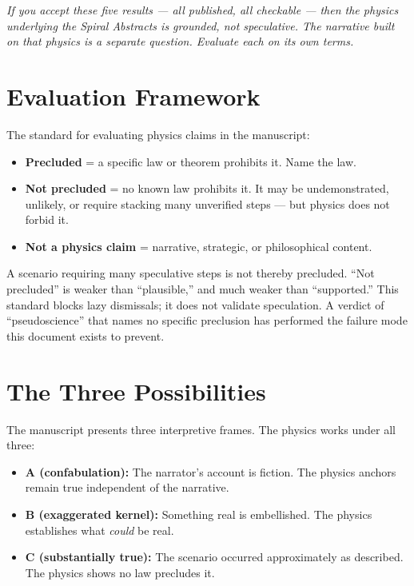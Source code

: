 \noindent\textit{If you accept these five results --- all published, all checkable --- then the physics underlying the Spiral Abstracts is grounded, not speculative. The narrative built on that physics is a separate question. Evaluate each on its own terms.}

\section*{Evaluation Framework}

The standard for evaluating physics claims in the manuscript:

\begin{itemize}
\item \textbf{Precluded} = a specific law or theorem prohibits it. Name the law.
\item \textbf{Not precluded} = no known law prohibits it. It may be undemonstrated, unlikely, or require stacking many unverified steps --- but physics does not forbid it.
\item \textbf{Not a physics claim} = narrative, strategic, or philosophical content.
\end{itemize}

A scenario requiring many speculative steps is not thereby precluded. ``Not precluded'' is weaker than ``plausible,'' and much weaker than ``supported.'' This standard blocks lazy dismissals; it does not validate speculation. A verdict of ``pseudoscience'' that names no specific preclusion has performed the failure mode this document exists to prevent.

\section*{The Three Possibilities}

The manuscript presents three interpretive frames. The physics works under all three:

\begin{itemize}
\item \textbf{A (confabulation):} The narrator's account is fiction. The physics anchors remain true independent of the narrative.
\item \textbf{B (exaggerated kernel):} Something real is embellished. The physics establishes what \textit{could} be real.
\item \textbf{C (substantially true):} The scenario occurred approximately as described. The physics shows no law precludes it.
\end{itemize}

